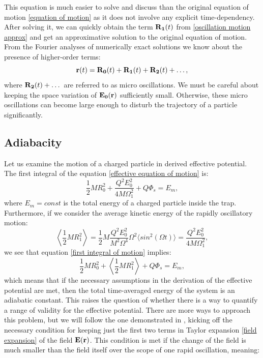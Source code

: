 This equation is much easier to solve and discuss than the original equation of motion \eqref{equation of motion} as it does not involve any explicit time-dependency. After solving it, we can quickly obtain the term $\vb{R_1}(t)$ from \eqref{oscillation motion approx} and get an approximative solution to the original equation of motion. From the Fourier analyses of numerically exact solutions \cite{gerlich1992inhomogeneous} we know about the presence of higher-order terms: $$\vb{r}(t) = \vb{R_0}(t) + \vb{R_1}(t) + \vb{R_2}(t) + \dots,$$ where $\vb{R_2}(t) + \dots$ are referred to as micro oscillations. We must be careful about keeping the space variation of $\vb{E_0}(\vb{r})$ sufficiently small. Otherwise, these micro oscillations can become large enough to disturb the trajectory of a particle significantly.

\subsection{Adiabacity}
Let us examine the motion of a charged particle in derived effective potential. The first integral of the equation \eqref{effective equation of motion} is:
\begin{equation}
	\label{first integral of motion}
	\dfrac{1}{2}M R_0^2 + \dfrac{Q^2 E_0^2}{4 M \Omega_1^2} + Q\Phi_s = E_m,
\end{equation}
where $E_m = const$ is the total energy of a charged particle inside the trap. Furthermore, if we consider the average kinetic energy of the rapidly oscillatory motion:
\begin{equation}
	\left\langle \dfrac{1}{2} M R_1^2 \right\rangle = \dfrac{1}{2}M \dfrac{Q^2 E_0^2}{M^2 \Omega^4}\Omega^2 \langle sin^2(\Omega t) \rangle = \dfrac{Q^2 E_0^2}{4 M \Omega_1^2},
\end{equation}
we see that equation \eqref{first integral of motion} implies:
\begin{equation}
	\label{adiabatic constant}
	\dfrac{1}{2}M R_0^2 + \left\langle \dfrac{1}{2} M R_1^2 \right\rangle + Q\Phi_s = E_m,
\end{equation}
which means that if the necessary assumptions in the derivation of the effective potential are met, then the total time-averaged energy of the system is an adiabatic constant. This raises the question of whether there is a way to quantify a range of validity for the effective potential. There are more ways to approach this problem, but we will follow the one demonstrated in \cite{gerlich1992inhomogeneous}, kicking off the necessary condition for keeping just the first two terms in Taylor expansion \eqref{field expansion} of the field $\vb{E}(\vb{r})$. This condition is met if the change of the field is much smaller than the field itself over the scope of one rapid oscillation, meaning:
